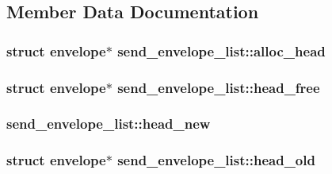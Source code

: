 \subsection{\-Member \-Data \-Documentation}
\hypertarget{structsend__envelope__list_a30d44c3a034817520d02894ff77c2092}{
\subsubsection[{alloc\-\_\-head}]{\setlength{\rightskip}{0pt plus 5cm}struct {\bf envelope}$\ast$ {\bf send\-\_\-envelope\-\_\-list\-::alloc\-\_\-head}}}\label{structsend__envelope__list_a30d44c3a034817520d02894ff77c2092}
\hypertarget{structsend__envelope__list_a0e2ab025b8d30d676b6a968bf12377fc}{
\subsubsection[{head\-\_\-free}]{\setlength{\rightskip}{0pt plus 5cm}struct {\bf envelope}$\ast$ {\bf send\-\_\-envelope\-\_\-list\-::head\-\_\-free}}}\label{structsend__envelope__list_a0e2ab025b8d30d676b6a968bf12377fc}
\hypertarget{structsend__envelope__list_a636fe4aa11bf8961cd3c3e834186c24c}{
\subsubsection[{head\-\_\-new}]{ {\bf send\-\_\-envelope\-\_\-list\-::head\-\_\-new}}}\label{structsend__envelope__list_a636fe4aa11bf8961cd3c3e834186c24c}
\hypertarget{structsend__envelope__list_af74f4cd828255f28b769d1ecfd93bf58}{
\subsubsection[{head\-\_\-old}]{\setlength{\rightskip}{0pt plus 5cm}struct {\bf envelope}$\ast$ {\bf send\-\_\-envelope\-\_\-list\-::head\-\_\-old}}}\label{structsend__envelope__list_af74f4cd828255f28b769d1ecfd93bf58}

